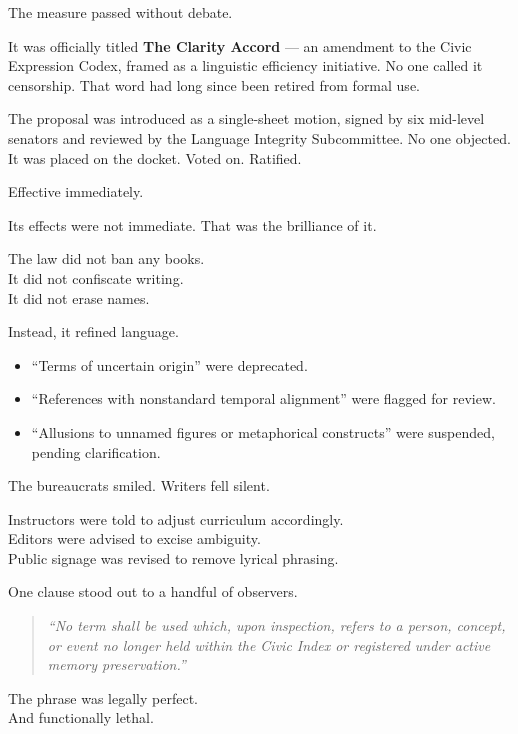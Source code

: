 \documentclass[12pt]{article}
\begin{document}
The measure passed without debate.

It was officially titled \textbf{The Clarity Accord} --- an amendment to the Civic Expression Codex, framed as a linguistic efficiency initiative. No one called it censorship. That word had long since been retired from formal use.

The proposal was introduced as a single-sheet motion, signed by six mid-level senators and reviewed by the Language Integrity Subcommittee. No one objected. It was placed on the docket. Voted on. Ratified.

Effective immediately.

\vspace{1em}

Its effects were not immediate. That was the brilliance of it.

The law did not ban any books.\\
It did not confiscate writing.\\
It did not erase names.

Instead, it refined language.

\begin{itemize}
    \item “Terms of uncertain origin” were deprecated.
    \item “References with nonstandard temporal alignment” were flagged for review.
    \item “Allusions to unnamed figures or metaphorical constructs” were suspended, pending clarification.
\end{itemize}

The bureaucrats smiled. Writers fell silent.

Instructors were told to adjust curriculum accordingly.\\
Editors were advised to excise ambiguity.\\
Public signage was revised to remove lyrical phrasing.

\vspace{1em}

One clause stood out to a handful of observers.

\begin{quote}
\textit{“No term shall be used which, upon inspection, refers to a person, concept, or event no longer held within the Civic Index or registered under active memory preservation.”}
\end{quote}

The phrase was legally perfect.\\
And functionally lethal.
\end{document}
